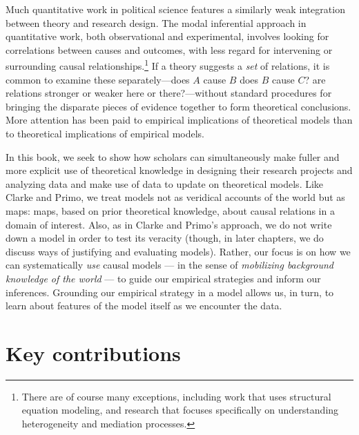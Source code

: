 \documentclass[
  12pt,
]{book}
\begin{document}
Much quantitative work in political science features a similarly weak integration between theory and research design. The modal inferential approach in quantitative work, both observational and experimental, involves looking for correlations between causes and outcomes, with less regard for intervening or surrounding causal relationships.\footnote{There are of course many exceptions, including work that uses structural equation modeling, and research that focuses specifically on understanding heterogeneity and mediation processes.} If a theory suggests a \emph{set} of relations, it is common to examine these separately---does \(A\) cause \(B\) does \(B\) cause \(C\)? are relations stronger or weaker here or there?---without standard procedures for bringing the disparate pieces of evidence together to form theoretical conclusions. More attention has been paid to empirical implications of theoretical models than to theoretical implications of empirical models.

In this book, we seek to show how scholars can simultaneously make fuller and more explicit use of theoretical knowledge in designing their research projects and analyzing data and make use of data to update on theoretical models. Like Clarke and Primo, we treat models not as veridical accounts of the world but as maps: maps, based on prior theoretical knowledge, about causal relations in a domain of interest. Also, as in Clarke and Primo's approach, we do not write down a model in order to test its veracity (though, in later chapters, we do discuss ways of justifying and evaluating models). Rather, our focus is on how we can systematically \emph{use} causal models --- in the sense of \emph{mobilizing background knowledge of the world} --- to guide our empirical strategies and inform our inferences. Grounding our empirical strategy in a model allows us, in turn, to learn about features of the model itself as we encounter the data.

\hypertarget{key-contributions}{%
\section{Key contributions}\label{key-contributions}}
\end{document}
